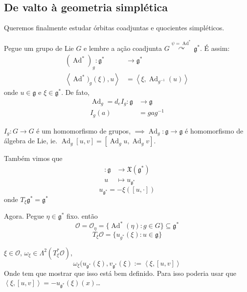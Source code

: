 \subsection{De valto à geometria simplética}

Queremos finalmente estudar órbitas coadjuntas e quocientes simpléticos.

Pegue um grupo de Lie $G$ e lembre a ação coadjunta $G\overset{\psi=\operatorname{Ad}^*}{ \curvearrowright }\mathfrak{g}^*$. É assim:
\begin{align*}
	(\operatorname{Ad}^*)_g: \mathfrak{g}^* &\longrightarrow \mathfrak{g}^* \\
	\left<\operatorname{Ad}^*)_g(\xi ),u\right>  &=\left<\xi,\operatorname{Ad}_{g^{-1}}(u)\right> 
\end{align*}
onde $u\in\mathfrak{g}$ e $\xi \in\mathfrak{g}^*$. De fato,
\begin{align*}
	\operatorname{Ad}_g=d_e I_g:\mathfrak{g} &\longrightarrow \mathfrak{g} \\
	I_g(a) &=gag^{-1}
\end{align*}

\begin{remark}
	$I_g:G\to G$ é um homomorfismo de grupos, $\implies \operatorname{Ad}_g:\mathfrak{g} \to \mathfrak{g}$ é homomorfismo de álgebra de Lie, ie. $\operatorname{Ad}_g[u,v]=[\operatorname{Ad}_gu,\operatorname{Ad}_gv]$.

	Também vimos que
	\begin{align*}
		: \mathfrak{g} &\longrightarrow \mathfrak{X}(\mathfrak{g}^*) \\
		u &\longmapsto u_{\mathfrak{g}^*}
	\end{align*}
	\[u_{\mathfrak{g}^*}=-\xi([u,\cdot ])\]
	onde $T_\xi \mathfrak{g}^*=\mathfrak{g}^*$
\end{remark}

Agora. Pegue $\eta\in\mathfrak{g}^*$ fixo. então
\[\mathcal{O}=\mathcal{O}_\eta=\{\operatorname{Ad}^*(\eta):g\in G\} \subseteq \mathfrak{g}^*\]
\[T_\xi \mathcal{O}=\{u_{g^*}(\xi ):u\in\mathfrak{g}\}\]

\begin{defn}
	$\xi \in\mathcal{O}$, $\omega_\xi \in\Lambda^{2}(T_\xi^*\mathcal{O})$,
	\[\omega_\xi(u_{\mathfrak{g}^*} (\xi ),v_{\mathfrak{g}^*}(\xi ):=\left<\xi,[u,v]\right> \]
	Onde tem que mostrar que isso está bem definido. Para isso poderia usar que $\left<\xi,[u,v]\right> =-u_{\mathfrak{g}^*}(\xi )(x)$…
\end{defn}

